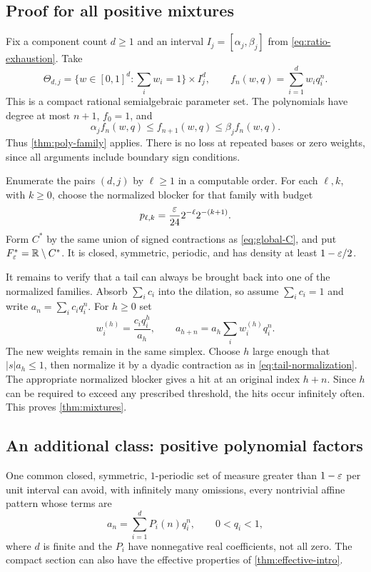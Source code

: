 \subsection{Proof for all positive mixtures}

Fix a component count $d\ge1$ and an interval $I_j=[\alpha_j,\beta_j]$
from \eqref{eq:ratio-exhaustion}. Take
\begin{equation}\label{eq:mixture-family}
 \Theta_{d,j}=\{w\in[0,1]^d:\textstyle\sum_iw_i=1\}\times I_j^d,
 \qquad f_n(w,q)=\sum_{i=1}^d w_iq_i^n.
\end{equation}
This is a compact rational semialgebraic parameter set. The polynomials
have degree at most $n+1$, $f_0=1$, and
\[
 \alpha_j f_n(w,q)\le f_{n+1}(w,q)\le\beta_j f_n(w,q).
\]
Thus \cref{thm:poly-family} applies. There is no loss at repeated bases
or zero weights, since all arguments include boundary sign conditions.

Enumerate the pairs $(d,j)$ by $\ell\ge1$ in a computable order.
For each $\ell,k$, with $k\ge0$, choose the normalized blocker for
that family with budget
\[
 p_{\ell,k}=\frac{\varepsilon}{24}2^{-\ell}2^{-(k+1)}.
\]
Form $C^*$ by the same union of signed contractions as
\eqref{eq:global-C}, and put $F^*_\varepsilon=\mathbb R\setminus C^*$.
It is closed, symmetric, periodic, and has density at least $1-\varepsilon/2$.

It remains to verify that a tail can always be brought back into one
of the normalized families. Absorb $\sum_i c_i$ into the dilation,
so assume $\sum_i c_i=1$ and write $a_n=\sum_i c_iq_i^n$.
For $h\ge0$ set
\begin{equation}\label{eq:mixture-tail}
 w_i^{(h)}=\frac{c_iq_i^h}{a_h},
 \qquad
 a_{h+n}=a_h\sum_i w_i^{(h)}q_i^n.
\end{equation}
The new weights remain in the same simplex. Choose $h$ large enough
that $|s|a_h\le1$, then normalize it by a dyadic contraction as in
\eqref{eq:tail-normalization}. The appropriate normalized blocker
gives a hit at an original index $h+n$. Since $h$ can be required to
exceed any prescribed threshold, the hits occur infinitely often.
This proves \cref{thm:mixtures}.

\subsection{An additional class: positive polynomial factors}

\begin{corollary}\label{cor:exp-polynomial}
One common closed, symmetric, $1$-periodic set of measure greater than
$1-\varepsilon$ per unit interval can avoid, with infinitely many omissions,
every nontrivial affine pattern whose terms are
\begin{equation}\label{eq:positive-exp-poly}
 a_n=\sum_{i=1}^d P_i(n)q_i^n,
 \qquad 0<q_i<1,
\end{equation}
where $d$ is finite and the $P_i$ have nonnegative real coefficients,
not all zero. The compact section can also have the effective properties
of \cref{thm:effective-intro}.
\end{corollary}

